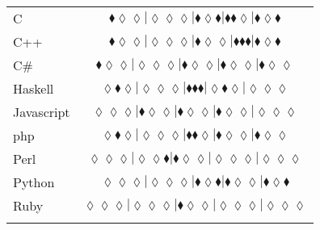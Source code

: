 \begin{table*}
{\begin{tabular}{l c}
C & $\scriptscriptstyle\blacklozenge\lozenge\lozenge|\lozenge\lozenge\lozenge|\blacklozenge\lozenge\blacklozenge|\blacklozenge\blacklozenge\lozenge|\blacklozenge\lozenge\blacklozenge$ \\
C++ & $\scriptscriptstyle\blacklozenge\lozenge\lozenge|\lozenge\lozenge\lozenge|\blacklozenge\lozenge\lozenge|\blacklozenge\blacklozenge\blacklozenge|\blacklozenge\lozenge\blacklozenge$ \\
C\# & $\scriptscriptstyle\blacklozenge\lozenge\lozenge|\lozenge\lozenge\lozenge|\blacklozenge\lozenge\lozenge|\blacklozenge\lozenge\lozenge|\blacklozenge\lozenge\lozenge$ \\
Haskell & $\scriptscriptstyle\lozenge\blacklozenge\lozenge|\lozenge\lozenge\lozenge|\blacklozenge\blacklozenge\blacklozenge|\lozenge\blacklozenge\lozenge|\lozenge\lozenge\lozenge$ \\
Javascript & $\scriptscriptstyle\lozenge\lozenge\lozenge|\blacklozenge\lozenge\lozenge|\blacklozenge\lozenge\lozenge|\blacklozenge\lozenge\lozenge|\lozenge\lozenge\lozenge$ \\
{\sc php} & $\scriptscriptstyle\lozenge\blacklozenge\lozenge|\lozenge\lozenge\lozenge|\blacklozenge\blacklozenge\lozenge|\blacklozenge\lozenge\lozenge|\blacklozenge\lozenge\lozenge$ \\
Perl & $\scriptscriptstyle\lozenge\lozenge\lozenge|\lozenge\lozenge\blacklozenge|\blacklozenge\lozenge\lozenge|\lozenge\lozenge\lozenge|\lozenge\lozenge\lozenge$ \\
Python & $\scriptscriptstyle\lozenge\lozenge\lozenge|\lozenge\lozenge\lozenge|\blacklozenge\lozenge\blacklozenge|\blacklozenge\lozenge\lozenge|\blacklozenge\lozenge\blacklozenge$ \\
Ruby & $\scriptscriptstyle\lozenge\lozenge\lozenge|\lozenge\lozenge\lozenge|\blacklozenge\lozenge\lozenge|\lozenge\lozenge\lozenge|\lozenge\lozenge\lozenge$ \\

\hline
& \\
\end{tabular}
} 
\end{table*}
